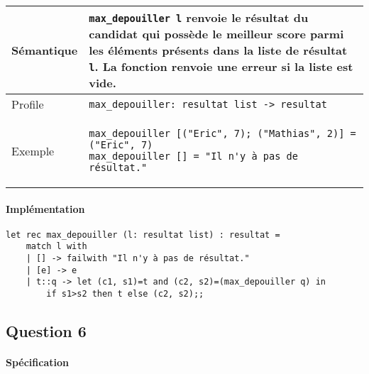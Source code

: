\documentclass[french, 10pt, a4paper]{article}
\begin{document}
\begin{center}
	\begin{tabular}{|p{2cm}|p{\dimexpr\linewidth-2cm-4\tabcolsep-3\arrayrulewidth}|}
		\hline
		Sémantique
		&
		\texttt{max_depouiller l} renvoie le résultat du candidat qui possède le meilleur score parmi les éléments présents dans la liste de résultat \texttt{l}. La fonction renvoie une erreur si la liste est vide. %
%
		\\
		\hline
		Profile
		&
		\texttt{max_depouiller: resultat list -> resultat}
%
		\\
		\hline
		Exemple
		&
		\begin{verbatim}
max_depouiller [("Eric", 7); ("Mathias", 2)] = ("Eric", 7)
max_depouiller [] = "Il n'y à pas de résultat."
		\end{verbatim}
%
		\\
		\hline
	\end{tabular}
\end{center}

\paragraph{Implémentation}

\begin{verbatim}
let rec max_depouiller (l: resultat list) : resultat =
	match l with
	| [] -> failwith "Il n'y à pas de résultat."
	| [e] -> e
	| t::q -> let (c1, s1)=t and (c2, s2)=(max_depouiller q) in
		if s1>s2 then t else (c2, s2);;
\end{verbatim}



\subsection{Question 6}

\paragraph{Spécification}
\end{document}
